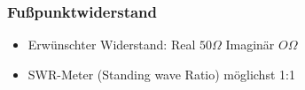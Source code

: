 
%


\begin{frame}
  \frametitle{Fußpunktwiderstand}
  \begin{center}
    \begin{itemize}
      \item Erwünschter Widerstand: Real $50 \Omega$ Imaginär $O \Omega$
      \item SWR-Meter (Standing wave Ratio) möglichst 1:1
    \end{itemize}
  \end{center}
\end{frame}


